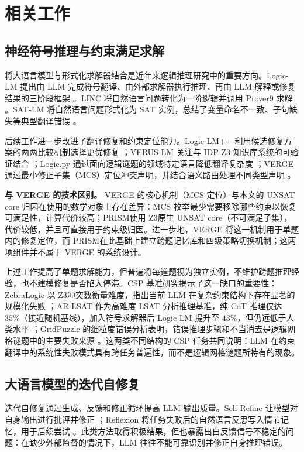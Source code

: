 \documentclass[UTF8,a4paper,12pt]{ctexart}
\newcommand{\PRISM}{PRISM}
\newcommand{\zthree}{Z3}
\begin{document}
\section{相关工作}

\subsection{神经符号推理与约束满足求解}

将大语言模型与形式化求解器结合是近年来逻辑推理研究中的重要方向。Logic-LM 提出由 LLM 完成符号翻译、由外部求解器执行推理、再由 LLM 解释或修复结果的三阶段框架 \cite{pan2023}。LINC 将自然语言问题转化为一阶逻辑并调用 Prover9 求解 \cite{olausson2023}。SAT-LM 将自然语言问题形式化为 SAT 实例，总结了变量命名不一致、子句缺失等典型翻译错误 \cite{ye2023}。

后续工作进一步改进了翻译修复和约束定位能力。Logic-LM++ 利用候选修复方案的两两比较机制选择更优修复 \cite{kirtania2024}；VERUS-LM 关注与 IDP-Z3 知识库系统的可验证结合 \cite{callewaert2025}；Logic.py 通过面向逻辑谜题的领域特定语言降低翻译复杂度 \cite{kesseli2025}；VERGE 通过最小修正子集（MCS）定位冲突声明，并结合语义路由处理不同类型声明 \cite{singh2026}。

\textbf{与 VERGE 的技术区别。} VERGE 的核心机制（MCS 定位）与本文的 UNSAT core 归因在使用的数学对象上存在差异：MCS 枚举最少需要移除哪些约束以恢复可满足性，计算代价较高；\PRISM 使用 \zthree 原生 UNSAT core（不可满足子集），代价较低，并且可直接用于约束级归因。进一步地，VERGE 将这一机制用于单题内的修复定位，而 \PRISM 在此基础上建立跨题记忆库和四级策略切换机制；这两项组件并不属于 VERGE 的系统设计。

上述工作提高了单题求解能力，但普遍将每道题视为独立实例，不维护跨题推理经验，也不建模修复是否陷入停滞。CSP 基准研究揭示了这一缺口的重要性：ZebraLogic 以 \zthree 冲突数衡量难度，指出当前 LLM 在复杂约束结构下存在显著的规模化失败 \cite{lin2025}；AR-LSAT 作为高难度 LSAT 分析推理基准，纯 CoT 推理仅达 \(35\%\)（接近随机基线），加入符号求解器后 Logic-LM 提升至 \(43\%\)，但仍远低于人类水平 \cite{zhong2022,pan2023}；GridPuzzle 的细粒度错误分析表明，错误推理步骤和不当消去是逻辑网格谜题中的主要失败来源 \cite{tyagi2024}。这两类不同结构的 CSP 任务共同说明：LLM 在约束翻译中的系统性失败模式具有跨任务普遍性，而不是逻辑网格谜题所特有的现象。

\subsection{大语言模型的迭代自修复}

迭代自修复通过生成、反馈和修正循环提高 LLM 输出质量。Self-Refine 让模型对自身输出进行批评并修正 \cite{madaan2023}；Reflexion 将任务失败后的自然语言反思写入情节记忆，用于后续尝试 \cite{shinn2023}。此类方法取得积极结果，但也暴露出自反馈信号不稳定的问题：在缺少外部监督的情况下，LLM 往往不能可靠识别并修正自身推理错误。
\end{document}
